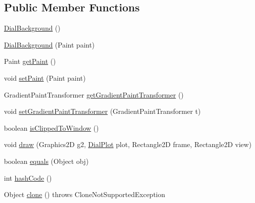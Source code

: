 \subsection*{Public Member Functions}
\begin{DoxyCompactItemize}
\item 
\mbox{\hyperlink{classorg_1_1jfree_1_1chart_1_1plot_1_1dial_1_1_dial_background_a1238691c72c0db463c986dfac4182e73}{Dial\+Background}} ()
\item 
\mbox{\hyperlink{classorg_1_1jfree_1_1chart_1_1plot_1_1dial_1_1_dial_background_ae3dc748b61e7ea114d2ecf500af91dcd}{Dial\+Background}} (Paint paint)
\item 
Paint \mbox{\hyperlink{classorg_1_1jfree_1_1chart_1_1plot_1_1dial_1_1_dial_background_a3ec700ecf1d9518ea4f6ae98bf8d97aa}{get\+Paint}} ()
\item 
void \mbox{\hyperlink{classorg_1_1jfree_1_1chart_1_1plot_1_1dial_1_1_dial_background_a1fd67d534fd46234b811a2707977a690}{set\+Paint}} (Paint paint)
\item 
Gradient\+Paint\+Transformer \mbox{\hyperlink{classorg_1_1jfree_1_1chart_1_1plot_1_1dial_1_1_dial_background_ade7f0d760e45a220a3bbcdf87a983385}{get\+Gradient\+Paint\+Transformer}} ()
\item 
void \mbox{\hyperlink{classorg_1_1jfree_1_1chart_1_1plot_1_1dial_1_1_dial_background_a908b45fd3e17a9ed6f681e5083410371}{set\+Gradient\+Paint\+Transformer}} (Gradient\+Paint\+Transformer t)
\item 
boolean \mbox{\hyperlink{classorg_1_1jfree_1_1chart_1_1plot_1_1dial_1_1_dial_background_a739b0c346187530a0a5a953cb92d03d8}{is\+Clipped\+To\+Window}} ()
\item 
void \mbox{\hyperlink{classorg_1_1jfree_1_1chart_1_1plot_1_1dial_1_1_dial_background_affe2269534d2e20f4cdc64cfa1fbd8ea}{draw}} (Graphics2D g2, \mbox{\hyperlink{classorg_1_1jfree_1_1chart_1_1plot_1_1dial_1_1_dial_plot}{Dial\+Plot}} plot, Rectangle2D frame, Rectangle2D view)
\item 
boolean \mbox{\hyperlink{classorg_1_1jfree_1_1chart_1_1plot_1_1dial_1_1_dial_background_ab474c79eeb00ee3b42f57ed7b6563af2}{equals}} (Object obj)
\item 
int \mbox{\hyperlink{classorg_1_1jfree_1_1chart_1_1plot_1_1dial_1_1_dial_background_ad2e6dff5ca7da7dc2b2c30f8fc896209}{hash\+Code}} ()
\item 
Object \mbox{\hyperlink{classorg_1_1jfree_1_1chart_1_1plot_1_1dial_1_1_dial_background_a87b1683bd8ab95ce6073617d47968665}{clone}} ()  throws Clone\+Not\+Supported\+Exception 
\end{DoxyCompactItemize}
